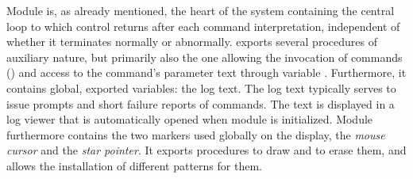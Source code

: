 Module  is, as already mentioned, the heart of the system
containing the central loop to which control returns after each
command interpretation, independent of whether it terminates normally
or abnormally.  exports several procedures of auxiliary nature,
but primarily also the one allowing the invocation of commands ()
and access to the command's parameter text through variable
. Furthermore, it contains global, exported variables: the
log text. The log text typically serves to issue prompts and short
failure reports of commands. The text is displayed in a log viewer
that is automatically opened when module  is initialized. Module
 furthermore contains the two markers used globally on the
display, the \emph{mouse cursor} and the \emph{star pointer}. It exports procedures
to draw and to erase them, and allows the installation of different
patterns for them.

